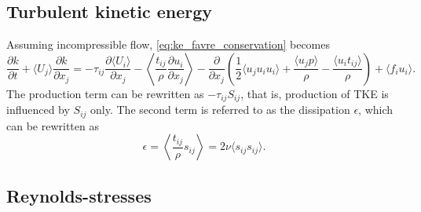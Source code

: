 \documentclass[oneside,a4paper,11pt]{report}
\newcommand{\rs}{\tau}          %
\newcommand{\uiavg}{\langle U_i \rangle}
\newcommand{\ujavg}{\langle U_j \rangle}
\newcommand{\uifluc}{u_i}
\newcommand{\ujfluc}{u_j}
\begin{document}
\subsection{Turbulent kinetic energy}
Assuming incompressible flow, \cref{eq:ke_favre_conservation} becomes  
\begin{equation}
\label{eq:tke_ransflow}
\frac{\partial k}{\partial t} + \ujavg \frac{\partial k}{\partial x_j} = -\rs_{ij} \frac{ \partial \uiavg }{ \partial x_j} - \left < \frac{ t_{ij} }{\rho} \frac{ \partial u_i }{ \partial x_j} \right > - \frac{\partial}{\partial x_j} \left ( \frac{1}{2} \langle \ujfluc \uifluc \uifluc \rangle + \frac{ \langle \ujfluc p \rangle }{ \rho } - \frac{ \langle \uifluc t_{ij} \rangle }{ \rho } \right ) + \langle f_i \uifluc \rangle .
\end{equation}
The production term can be rewritten as $-\rs_{ij} S_{ij}$, that is, production of TKE is influenced by $S_{ij}$ only. The second term is referred to as the dissipation $\epsilon$, which can be rewritten as
\begin{equation}
\epsilon = \left < \frac{ t_{ij} }{ \rho } s_{ij} \right > = 2 \nu \langle s_{ij} s_{ij} \rangle.
\end{equation}

\subsection{Reynolds-stresses}
\end{document}
